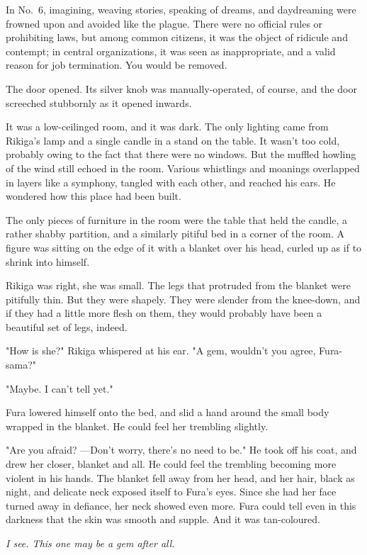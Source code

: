 In No.~6, imagining, weaving stories, speaking of dreams, and
daydreaming were frowned upon and avoided like the plague. There were no
official rules or prohibiting laws, but among common citizens, it was
the object of ridicule and contempt; in central organizations, it was
seen as inappropriate, and a valid reason for job termination. You would
be removed.

The door opened. Its silver knob was manually-operated, of course, and
the door screeched stubbornly as it opened inwards.

It was a low-ceilinged room, and it was dark. The only lighting came
from Rikiga's lamp and a single candle in a stand on the table. It
wasn't too cold, probably owing to the fact that there were no windows.
But the muffled howling of the wind still echoed in the room. Various
whistlings and moanings overlapped in layers like a symphony, tangled
with each other, and reached his ears. He wondered how this place had
been built.

The only pieces of furniture in the room were the table that held the
candle, a rather shabby partition, and a similarly pitiful bed in a
corner of the room. A figure was sitting on the edge of it with a
blanket over his head, curled up as if to shrink into himself.

Rikiga was right, she was small. The legs that protruded from the
blanket were pitifully thin. But they were shapely. They were slender
from the knee-down, and if they had a little more flesh on them, they
would probably have been a beautiful set of legs, indeed.

"How is she?" Rikiga whispered at his ear. "A gem, wouldn't you agree,
Fura-sama?"

"Maybe. I can't tell yet."

Fura lowered himself onto the bed, and slid a hand around the small body
wrapped in the blanket. He could feel her trembling slightly.

"Are you afraid? ---Don't worry, there's no need to be." He took off his
coat, and drew her closer, blanket and all. He could feel the trembling
becoming more violent in his hands. The blanket fell away from her head,
and her hair, black as night, and delicate neck exposed itself to Fura's
eyes. Since she had her face turned away in defiance, her neck showed
even more. Fura could tell even in this darkness that the skin was
smooth and supple. And it was tan-coloured.

\emph{I see. This one may be a gem after all.}

